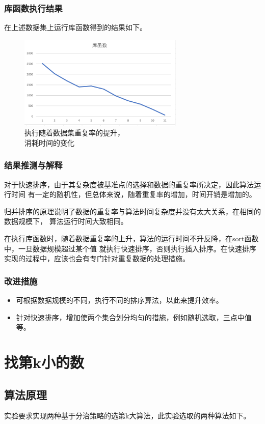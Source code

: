 \documentclass[UTF8]{ctexart}
\begin{document}
\subsubsection{库函数执行结果}
在上述数据集上运行库函数得到的结果如下。
\begin{figure}[H]
    \centering
    \includegraphics[width=0.7\textwidth]{figure3.png}
    \caption{执行随着数据集重复率的提升，\\消耗时间的变化}
\end{figure}
\subsubsection{结果推测与解释}
对于快速排序，由于其复杂度被基准点的选择和数据的重复率所决定，因此算法运行时间
有一定的随机性，但总体来说，随着重复率的增加，时间开销是增加的。\par
归并排序的原理说明了数据的重复率与算法时间复杂度并没有太大关系，在相同的数据规模下，
算法运行时间大致相同。\par
在执行库函数时，随着数据重复率的上升，算法的运行时间不升反降，在sort函数中，一旦数据规模超过某个值
就执行快速排序，否则执行插入排序。在快速排序实现的过程中，应该也会有专门针对重复数据的处理措施。\par
\subsubsection{改进措施}
\begin{itemize}
    \item 可根据数据规模的不同，执行不同的排序算法，以此来提升效率。
    \item 针对快速排序，增加使两个集合划分均匀的措施，例如随机选取，三点中值等。
\end{itemize}
\section{找第k小的数}
\thispagestyle{empty}
\subsection{算法原理}
实验要求实现两种基于分治策略的选第k大算法，此实验选取的两种算法如下。
\end{document}
